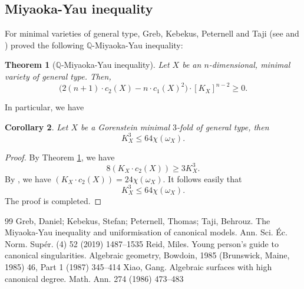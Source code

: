 \documentclass[10pt,a4paper]{amsart}
\newtheorem{thm}{Theorem}[section]
\newtheorem{cor}[thm]{Corollary}
\numberwithin{equation}{section}
\newcommand{\QQ}{\mathbb{Q}}
\begin{document}
\subsection{Miyaoka-Yau inequality}

For minimal varieties of general type, Greb, Kebekus, Peternell and Taji (see \cite[Theorem 1.1]{GKPT19} and \cite[line 12 in \S 1.1, page 1488]{GKPT19}) proved the following $\QQ$-Miyaoka-Yau inequality:

\begin{thm}[$\mathbb{Q}$-Miyaoka-Yau inequality]\label{thm: MY1}
Let $X$ be an $n$-dimensional, minimal variety of general type. Then,
\begin{equation*}
\bigl(2(n+1)\cdot c_2(X) - n\cdot c_1(X)^2\bigr)\cdot [K_X]^{n-2} \geq 0.
\end{equation*}
\end{thm}
In particular, we have

\begin{cor}
    Let $X$ be a Gorenstein minimal $3$-fold of general type, then 
    \begin{equation}\label{MY}
        K_X^3\leq 64\chi(\omega_X).
    \end{equation}
   
\end{cor}

\begin{proof}
    By Theorem \ref{thm: MY1}, we have 
    $$
    8(K_X\cdot c_2(X))\geq 3K_X^3.
    $$
    By \cite[Corollary~10.3]{Rei87}, we have $(K_X\cdot c_2(X))=24\chi(\omega_X)$. It follows easily that 
    $$
    K_X^3\leq 64\chi(\omega_X).
    $$
    The proof is completed.
\end{proof}


\begin{thebibliography}{99}
 Greb, Daniel; Kebekus, Stefan; Peternell, Thomas; Taji, Behrouz. The {M}iyaoka-{Y}au inequality and uniformisation of canonical models. Ann. Sci. \'Ec. Norm. Sup\'er. (4) 52 (2019) 1487--1535
 Reid, Miles. Young person's guide to canonical singularities. Algebraic geometry, {B}owdoin, 1985 ({B}runswick, {M}aine, 1985) 46, Part 1 (1987) 345--414
 Xiao, Gang. Algebraic surfaces with high canonical degree. Math. Ann. 274 (1986) 473--483
\end{thebibliography}
\end{document}
